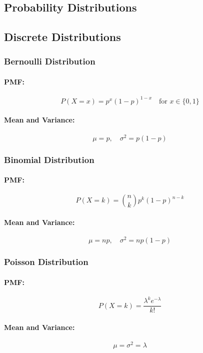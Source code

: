 \documentclass[8pt, a4paper, landscape, includeheadfoot]{extarticle}
\begin{document}
\begin{multicols*}{4}
	\section{Probability Distributions}

	\subsection{Discrete Distributions}

	\subsubsection{Bernoulli Distribution}{}
	\paragraph{PMF:}
	$$
		P(X = x) = p^x (1-p)^{1-x} \quad \text{for } x \in \{0,1\}
	$$
	\paragraph{Mean and Variance:}
	$$
		\mu = p, \quad \sigma^2 = p(1 - p)
	$$

	\subsubsection{Binomial Distribution}{}
	\paragraph{PMF:}
	$$
		P(X = k) = \binom{n}{k} p^k (1-p)^{n-k}
	$$
	\paragraph{Mean and Variance:}
	$$
		\mu = np, \quad \sigma^2 = np(1 - p)
	$$

	\subsubsection{Poisson Distribution}{}
	\paragraph{PMF:}
	$$
		P(X = k) = \frac{\lambda^k e^{-\lambda}}{k!}
	$$
	\paragraph{Mean and Variance:}
	$$
		\mu = \sigma^2 = \lambda
	$$


\end{multicols*}
\end{document}

